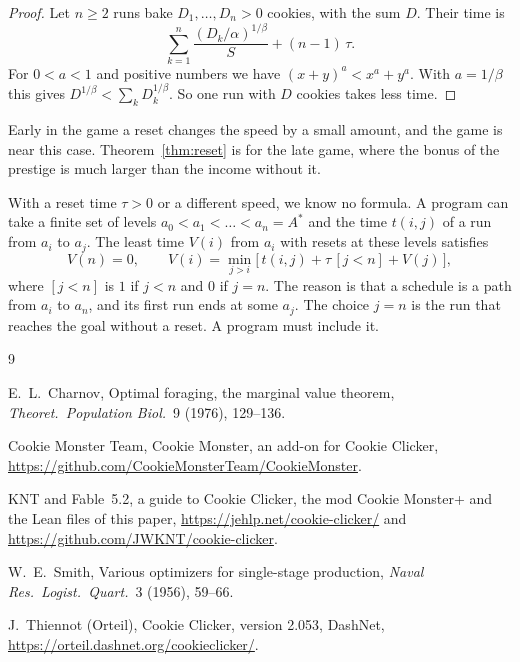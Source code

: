 \documentclass[11pt]{article}
\theoremstyle{boxed}
\begin{document}
\begin{proof}
Let $n\ge2$ runs bake $D_1,\dots,D_n>0$ cookies, with the sum $D$. Their time is
\[
  \sum_{k=1}^{n}\frac{(D_k/\alpha)^{1/\beta}}{S}+(n-1)\,\tau .
\]
For $0<a<1$ and positive numbers we have $(x+y)^{a}<x^{a}+y^{a}$. With $a=1/\beta$ this gives
$D^{1/\beta}<\sum_kD_k^{1/\beta}$. So one run with $D$ cookies takes less time.
\end{proof}

Early in the game a reset changes the speed by a small amount, and the game is near this case.
Theorem~\ref{thm:reset} is for the late game, where the bonus of the prestige is much larger
than the income without it.

With a reset time $\tau>0$ or a different speed, we know no formula. A program can take a finite
set of levels $a_0<a_1<\dots<a_n=A^{\ast}$ and the time $t(i,j)$ of a run from $a_i$ to $a_j$.
The least time $V(i)$ from $a_i$ with resets at these levels satisfies
\[
  V(n)=0,\qquad V(i)=\min_{j>i}\bigl[\,t(i,j)+\tau\,[j<n]+V(j)\,\bigr],
\]
where $[j<n]$ is $1$ if $j<n$ and $0$ if $j=n$. The reason is that a schedule is a path from
$a_i$ to $a_n$, and its first run ends at some $a_j$. The choice $j=n$ is the run that reaches
the goal without a reset. A program must include it.

\begin{thebibliography}{9}\small

 E.~L.~Charnov, Optimal foraging, the marginal value theorem,
\emph{Theoret.\ Population Biol.}\ 9 (1976), 129--136.

 Cookie Monster Team, Cookie Monster, an add-on for Cookie Clicker,
\url{https://github.com/CookieMonsterTeam/CookieMonster}.

 KNT and Fable~5.2, a guide to Cookie Clicker, the mod Cookie Monster+ and the
Lean files of this paper, \url{https://jehlp.net/cookie-clicker/} and
\url{https://github.com/JWKNT/cookie-clicker}.

 W.~E.~Smith, Various optimizers for single-stage production,
\emph{Naval Res.\ Logist.\ Quart.}\ 3 (1956), 59--66.

 J.~Thiennot (Orteil), Cookie Clicker, version 2.053, DashNet,
\url{https://orteil.dashnet.org/cookieclicker/}.

\end{thebibliography}
\end{document}
